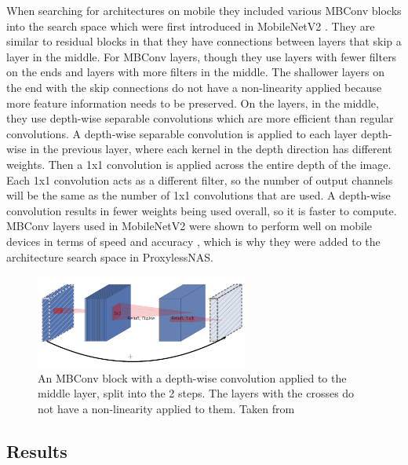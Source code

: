 \documentclass{ieee}
\begin{document}
When searching for architectures on mobile they included various MBConv blocks into the search space which were first introduced in MobileNetV2 \cite{sandler_howard_zhu_zhmoginov_chen_2018}. They are similar to residual blocks in that they have connections between layers that skip a layer in the middle. For MBConv layers, though they use layers with fewer filters on the ends and layers with more filters in the middle. The shallower layers on the end with the skip connections do not have a non-linearity applied because more feature information needs to be preserved. On the layers, in the middle, they use depth-wise separable convolutions which are more efficient than regular convolutions. A depth-wise separable convolution is applied to each layer depth-wise in the previous layer, where each kernel in the depth direction has different weights. Then a 1x1 convolution is applied across the entire depth of the image. Each 1x1 convolution acts as a different filter, so the number of output channels will be the same as the number of 1x1 convolutions that are used. A depth-wise convolution results in fewer weights being used overall, so it is faster to compute. \cite{separable_convolutions_2018} MBConv layers used in MobileNetV2 were shown to perform well on mobile devices in terms of speed and accuracy \cite{sandler_howard_zhu_zhmoginov_chen_2018}, which is why they were added to the architecture search space in ProxylessNAS.

\begin{figure}[h]
    \begin{center}
    \includegraphics[width=7cm]{images/mbconv.png}
    \end{center}
    \label{mbconv_fig}
    \caption{An MBConv block with a depth-wise convolution applied to the middle layer, split into the 2 steps. The layers with the crosses do not have a non-linearity applied to them. Taken from \cite{sandler_howard_zhu_zhmoginov_chen_2018}}
\end{figure}

\subsection{Results}
\end{document}
